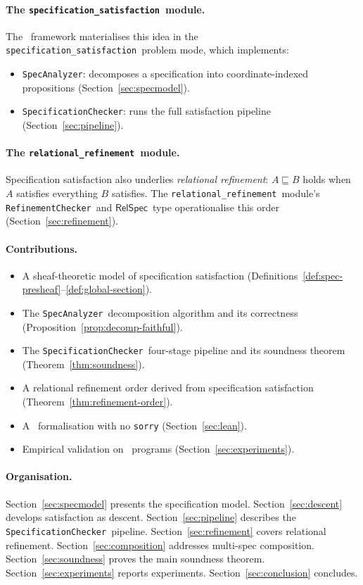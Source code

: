 \documentclass[11pt]{article}
\newcommand{\Refine}{\sqsubseteq}                   %
\newcommand{\RelSpec}{\ensuremath{\mathsf{RelSpec}}} %
\newcommand{\specpkg}{\texttt{specification\_satisfaction}}
\newcommand{\relpkg}{\texttt{relational\_refinement}}
\newcommand{\SpecificationChecker}{\texttt{SpecificationChecker}}
\newcommand{\SpecAnalyzer}{\texttt{SpecAnalyzer}}
\newcommand{\RefinementChecker}{\texttt{RefinementChecker}}
\begin{document}
\paragraph{The \specpkg\ module.}
The \JuGeo\ framework materialises this idea in the
\specpkg\ problem mode, which implements:
\begin{itemize}[leftmargin=2em]
  \item \SpecAnalyzer: decomposes a specification into
        coordinate-indexed propositions (Section~\ref{sec:specmodel}).
  \item \SpecificationChecker: runs the full satisfaction pipeline
        (Section~\ref{sec:pipeline}).
\end{itemize}

\paragraph{The \relpkg\ module.}
Specification satisfaction also underlies \emph{relational refinement}:
$A \Refine B$ holds when $A$ satisfies everything $B$ satisfies.  The
\relpkg\ module's \RefinementChecker\ and \RelSpec\ type operationalise
this order (Section~\ref{sec:refinement}).

\paragraph{Contributions.}
\begin{itemize}[leftmargin=2em]
  \item A sheaf-theoretic model of specification satisfaction
        (Definitions~\ref{def:spec-presheaf}--\ref{def:global-section}).
  \item The \SpecAnalyzer\ decomposition algorithm and its correctness
        (Proposition~\ref{prop:decomp-faithful}).
  \item The \SpecificationChecker\ four-stage pipeline and its
        soundness theorem (Theorem~\ref{thm:soundness}).
  \item A relational refinement order derived from specification
        satisfaction (Theorem~\ref{thm:refinement-order}).
  \item A \LEAN\ formalisation with no \texttt{sorry}
        (Section~\ref{sec:lean}).
  \item Empirical validation on \numspec\ programs
        (Section~\ref{sec:experiments}).
\end{itemize}

\paragraph{Organisation.}
Section~\ref{sec:specmodel} presents the specification model.
Section~\ref{sec:descent} develops satisfaction as descent.
Section~\ref{sec:pipeline} describes the \SpecificationChecker\ pipeline.
Section~\ref{sec:refinement} covers relational refinement.
Section~\ref{sec:composition} addresses multi-spec composition.
Section~\ref{sec:soundness} proves the main soundness theorem.
Section~\ref{sec:experiments} reports experiments.
Section~\ref{sec:conclusion} concludes.
\end{document}
